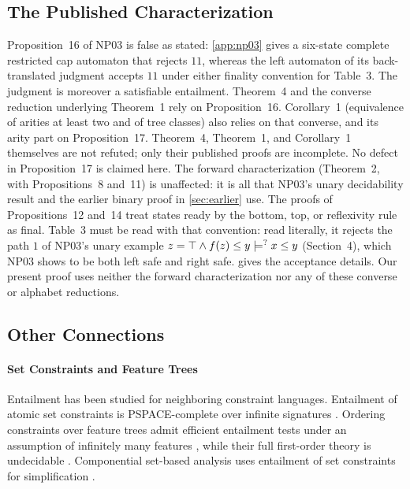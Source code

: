 \subsection{The Published Characterization}
\label{sec:errata}
Proposition~16 of NP03 is false as stated:
\cref{app:np03} gives a six-state complete restricted cap automaton that
rejects $11$, whereas the left automaton of its back-translated judgment
accepts $11$ under either finality convention for Table~3. The judgment
is moreover a satisfiable entailment. Theorem~4 and the converse
reduction underlying Theorem~1 rely on Proposition~16.
Corollary~1 (equivalence of arities at least two and of tree classes)
also relies on that converse, and its arity part on Proposition~17.
Theorem~4, Theorem~1, and Corollary~1 themselves are not refuted;
only their published proofs are incomplete. No defect in Proposition~17
is claimed here. The forward characterization
(Theorem~2, with Propositions~8 and~11) is unaffected: it is
all that NP03's unary decidability result and the earlier binary proof
in \cref{sec:earlier} use.
The proofs of Propositions~12 and~14 treat states ready by the bottom,
top, or reflexivity rule as final. Table~3 must be read with that
convention: read literally, it rejects the path $1$ of NP03's unary
example $z=\top\wedge f(z)\le y \models^{?} x \le y$ (Section~4), which NP03
shows to be both left safe and right safe.  gives the
acceptance details.
Our present proof uses neither the forward characterization nor any of
these converse or alphabet reductions.

\subsection{Other Connections}
\paragraph{Set Constraints and Feature Trees}
Entailment has been studied for neighboring constraint languages. Entailment of atomic set
constraints is PSPACE-complete over infinite signatures \citep{NiehrenMullerTalbot99}.
Ordering constraints over feature trees admit efficient entailment tests under an
assumption of infinitely many features \citep{MullerNiehrenPodelski00}, while their full
first-order theory is undecidable \citep{MullerNiehrenTreinen98}. Componential set-based
analysis uses entailment of set constraints for simplification \citep{FlanaganFelleisen99}.

